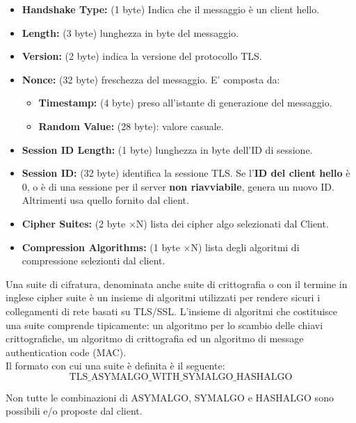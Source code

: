 \begin{definition}\label{def:serverhello}
\begin{itemize}
       \item \textbf{Handshake Type:} (1 byte) Indica che il messaggio è un client hello.
    \item \textbf{Length:} (3 byte) lunghezza in byte del messaggio.
    \item \textbf{Version:} (2 byte) indica la versione del protocollo TLS.
    \item \textbf{Nonce:} (32 byte) freschezza del messaggio. E' composta da:
    \begin{itemize}
        \item \textbf{Timestamp:} (4 byte) preso all'istante di generazione del messaggio.
        \item \textbf{Random Value:} (28 byte): valore casuale.
    \end{itemize}
    \item \textbf{Session ID Length:} (1 byte) lunghezza in byte dell'ID di sessione.
    \item \textbf{Session ID:} (32 byte) identifica la sessione TLS. Se l'\textbf{ID del client hello} è 0, o è di una sessione per il server \textbf{non riavviabile}, genera un nuovo ID. Altrimenti usa quello fornito dal client.
    \item \textbf{Cipher Suites:} (2 byte $\times$N) lista dei cipher algo selezionati dal Client.
    \item \textbf{Compression Algorithms:} (1 byte $\times$N) lista degli algoritmi di compressione selezionti dal client.
\end{itemize}
\end{definition}
\begin{corollary}
Una suite di cifratura, denominata anche suite di crittografia o con il termine in inglese cipher suite è un insieme di algoritmi utilizzati per rendere sicuri i collegamenti di rete basati su TLS/SSL. L'insieme di algoritmi che costituisce una suite comprende tipicamente: un algoritmo per lo scambio delle chiavi crittografiche, un algoritmo di crittografia ed un algoritmo di message authentication code (MAC).\\
Il formato con cui una suite è definita è il seguente:
\[\text{TLS\_ASYMALGO\_WITH\_SYMALGO\_HASHALGO}\]
\begin{remark}
Non tutte le combinazioni di ASYMALGO, SYMALGO e HASHALGO sono possibili e/o proposte dal client.
\end{remark}
\end{corollary}

